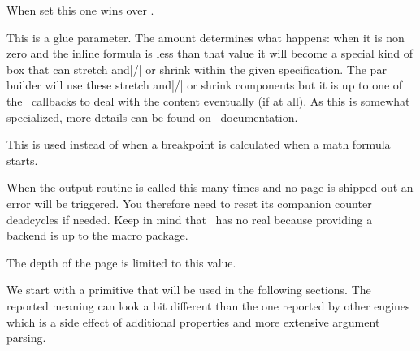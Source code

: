 \stopnewprimitive

\startnewprimitive[title={\prm {mathsurroundskip}}]

When set this one wins over .

\stopnewprimitive

\startnewprimitive[title={\prm {maththreshold}}]

This is a glue parameter. The amount determines what happens: when it is non zero
and the inline formula is less than that value it will become a special kind of
box that can stretch and|/| or shrink within the given specification. The par
builder will use these stretch and|/| or shrink components but it is up to one of
the \LUA\ callbacks to deal with the content eventually (if at all). As this is
somewhat specialized, more details can be found on \CONTEXT\ documentation.

\stopnewprimitive

\startnewprimitive[title={\prm {mathtolerance}}]

This is used instead of  when a breakpoint is calculated when a
math formula starts.

\stopnewprimitive

\startoldprimitive[title={\prm {maxdeadcycles}}]

When the output routine is called this many times and no page is shipped out an
error will be triggered. You therefore need to reset its companion counter \prm
{deadcycles} if needed. Keep in mind that \LUAMETATEX\ has no real 
because providing a backend is up to the macro package.

\stopoldprimitive

\startoldprimitive[title={\prm {maxdepth}}]

The depth of the page is limited to this value.

\stopoldprimitive

\startoldprimitive[title={\prm {meaning}}]

We start with a primitive that will be used in the following sections. The
reported meaning can look a bit different than the one reported by other engines
which is a side effect of additional properties and more extensive argument
parsing.

\startbuffer
\tolerant\permanent\protected\gdef\foo[#1]#*[#2]{(#1)(#2)} \meaning\foo
\stopbuffer

\typebuffer \getbuffer \glet\foo\relax

\stopoldprimitive


